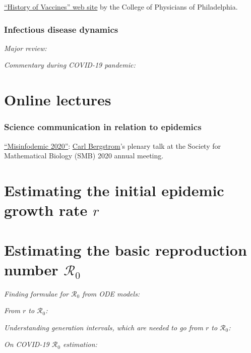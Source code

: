\documentclass[12pt]{article}
\newcommand{\R}{{\mathcal R}}
\begin{document}
\href{https://www.historyofvaccines.org/timeline/all}{``History of
  Vaccines'' web site} by the College of Physicians of Philadelphia.

\subsubsection*{Infectious disease dynamics}

\emph{Major review:}\\

\emph{Commentary during COVID-19 pandemic:}\\

\section*{Online lectures}

\subsubsection*{Science communication in relation to epidemics}

\href{https://www.youtube.com/watch?v=ZSp-k6C9qBw}{``Misinfodemic
  2020''}: \href{http://ctbergstrom.com/}{Carl Bergstrom}'s plenary
talk at the Society for Mathematical Biology (SMB) 2020 annual
meeting.

\section*{Estimating the initial epidemic growth rate $r$}



\section*{Estimating the basic reproduction number $\R_0$}

\emph{Finding formulae for $\R_0$ from ODE models:}\\

\emph{From $r$ to $\R_0$:}\\

\emph{Understanding generation intervals, which are needed to go from
  $r$ to $\R_0$:}\\

\emph{On COVID-19 $\R_0$ estimation:}\\
\end{document}
